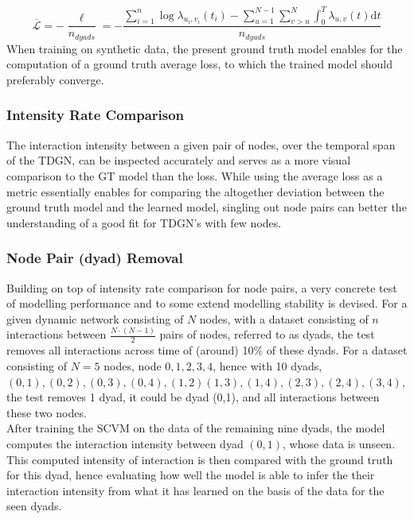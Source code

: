 \begin{equation}
   \overline{\mathcal{L}} = - \frac{\ell}{n_{dyads}} = - \frac{\sum_{i=1}^n \log \lambda_{u_i,v_i} (t_i) - \sum_{u=1}^{N-1} \sum_{v > u}^{N} \int_{0}^T \lambda_{u,v}(t) \mathrm{d} t}{n_{dyads}}
    \label{eq:LogLikelihoodFuncExplicit}
\end{equation}
When training on synthetic data, the present ground truth model enables for the computation of a ground truth average loss, to which the trained model should preferably converge.


\subsubsection{Intensity Rate Comparison}
\label{sec:Method:Evaluation:Intensity}
The interaction intensity between a given pair of nodes, over the temporal span of the TDGN, can be inspected accurately and serves as a more visual comparison to the GT model than the loss. 
While using the average loss as a metric essentially enables for comparing the altogether deviation between the ground truth model and the learned model, singling out node pairs can better the understanding of a good fit for TDGN's with few nodes.




\subsubsection{Node Pair (dyad) Removal}
\label{sec:Method:Evaluation:NodePairRemoval}
Building on top of intensity rate comparison for node pairs, a very concrete test of modelling performance and to some extend modelling stability is devised.
For a given dynamic network consisting of $N$ nodes, with a dataset consisting of $n$ interactions between $\frac{N\cdot(N-1)}{2}$ pairs of nodes, referred to as dyads, the test removes all interactions across time of (around) 10\% of these dyads.
For a dataset consisting of $N = 5$ nodes, node $0,1,2,3,4$, hence with 10 dyads, $(0,1), (0,2), (0,3), (0,4), (1,2) (1,3), (1,4), (2,3), (2,4), (3,4)$, the test removes 1 dyad, it could be dyad (0,1), and all interactions between these two nodes.
\\
After training the SCVM on the data of the remaining nine dyads, the model computes the interaction intensity between dyad $(0,1)$, whose data is unseen.
This computed intensity of interaction is then compared with the ground truth for this dyad, hence evaluating how well the model is able to infer the their interaction intensity from what it has learned on the basis of the data for the seen dyads.


